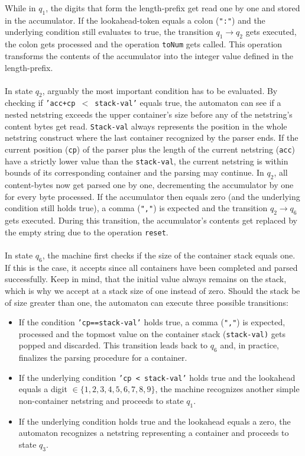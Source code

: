 While in $q_1$, the digits that form the length-prefix get read one by one and stored in the accumulator. If the lookahead-token equals a colon (\texttt{":"}) and the underlying condition still evaluates to true, the transition $q_1 \rightarrow q_2$ gets executed, the colon gets processed and the operation \texttt{toNum} gets called. This operation transforms the contents of the accumulator into the integer value defined in the length-prefix.\\\\
In state $q_2$, arguably the most important condition has to be evaluated. By checking if \texttt{'acc+cp $<$ stack-val'} equals true, the automaton can see if a nested netstring exceeds the upper container's size before any of the netstring's content bytes get read. \texttt{Stack-val} always represents the position in the whole netstring construct where the last container recognized by the parser ends. If the current position (\texttt{cp}) of the parser plus the length of the current netstring (\texttt{acc}) have a strictly lower value than the \texttt{stack-val}, the current netstring is within bounds of its corresponding container and the parsing may continue. In $q_2$, all content-bytes now get parsed one by one, decrementing the accumulator by one for every byte processed.
If the accumulator then equals zero (and the underlying condition still holds true), a comma (\texttt{","}) is expected and the transition $q_2 \rightarrow q_6$ gets executed. During this transition, the accumulator's contents get replaced by the empty string due to the operation \texttt{reset}.\\\\
In state $q_6$, the machine first checks if the size of the container stack equals one. If this is the case, it accepts since all containers have been completed and parsed successfully. Keep in mind, that the initial value always remains on the stack, which is why we accept at a stack size of one instead of zero. Should the stack be of size greater than one, the automaton can execute three possible transitions:
\begin{itemize}
    \item If the condition \texttt{'cp==stack-val'} holds true, a comma (\texttt{","}) is expected, processed and the topmost value on the container stack (\texttt{stack-val)} gets popped and discarded. This transition leads back to $q_6$ and, in practice, finalizes the parsing procedure for a container.
    \item If the underlying condition \texttt{'cp < stack-val'} holds true and the lookahead equals a digit $\in \{1,2,3,4,5,6,7,8,9\}$, the machine recognizes another simple non-container netstring and proceeds to state $q_1$.
    \item If the underlying condition holds true and the lookahead equals a zero, the automaton recognizes a netstring representing a container and proceeds to state $q_3$.
\end{itemize}
